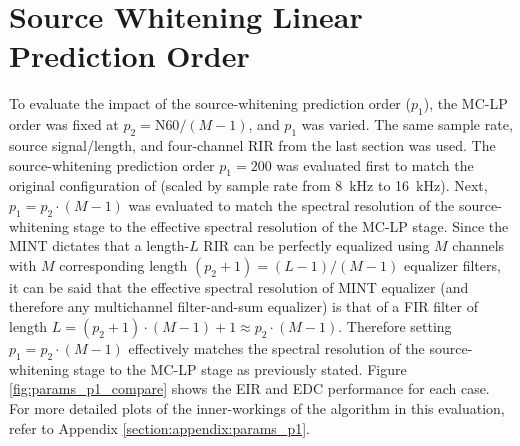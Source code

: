 \section{Source Whitening Linear Prediction Order} \label{section:params_p1} 

To evaluate the impact of the source-whitening prediction order ($p_1$), the MC-LP order was fixed at $p_2 = \mathrm{N60} / \left(M-1\right)$, and $p_1$ was varied. The same sample rate, source signal/length, and four-channel RIR from the last section was used. The source-whitening prediction order $p_1=200$ was evaluated first to match the original configuration of \cite{triki2006delay} (scaled by sample rate from \qty{8}{\kilo\hertz} to \qty{16}{\kilo\hertz}). Next, $p_1 = p_2 \cdot \left(M-1\right)$ was evaluated to match the spectral resolution of the source-whitening stage to the effective spectral resolution of the MC-LP stage. Since the MINT dictates that a length-$L$ RIR can be perfectly equalized using $M$ channels with $M$ corresponding length $\left(p_2+1\right) = \left(L-1\right)/\left(M-1\right)$ equalizer filters, it can be said that the effective spectral resolution of MINT equalizer (and therefore any multichannel filter-and-sum equalizer) is that of a FIR filter of length $L= \left(p_2+1\right) \cdot \left(M-1\right)  + 1 \approx p_2 \cdot \left(M-1\right)$. Therefore setting $p_1 = p_2 \cdot (M-1)$ effectively matches the spectral resolution of the source-whitening stage to the MC-LP stage as previously stated. Figure \ref{fig:params_p1_compare} shows the EIR and EDC performance for each case. For more detailed plots of the inner-workings of the algorithm in this evaluation, refer to Appendix \ref{section:appendix:params_p1}.


%

